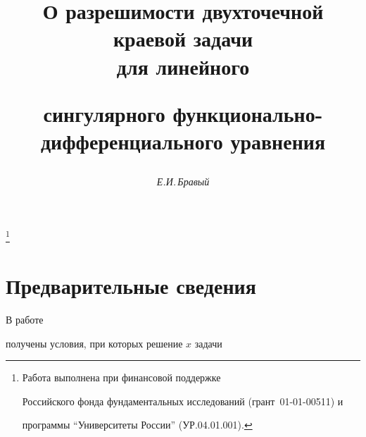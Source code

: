 \setcounter{page}{14}















\author{\it Е.И.\,Бравый}




\title{О разрешимости двухточечной краевой задачи\\ для линейного


сингулярного функционально-дифференциального уравнения}


\thanks{Работа выполнена при финансовой поддержке


Российского фонда фундаментальных исследований (грант \No\,01-01-00511) и


программы ``Университеты России'' (УР.04.01.001).}





\date{}




\pagestyle{plain} %







\maketitle


\label{begin}











\section{Предварительные сведения}





В работе


получены условия, при которых решение $x$ задачи


